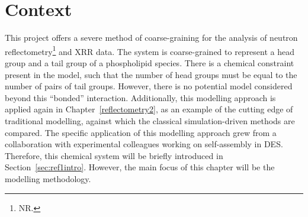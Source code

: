 \section*{Context}
This project offers a severe method of coarse-graining for the analysis of neutron reflectometry\footnote{NR.} and XRR data.
The system is coarse-grained to represent a head group and a tail group of a phospholipid species.
There is a chemical constraint present in the model, such that the number of head groups must be equal to the number of pairs of tail groups.
However, there is no potential model considered beyond this ``bonded'' interaction.
Additionally, this modelling approach is applied again in Chapter~\ref{reflectometry2}, as an example of the cutting edge of traditional modelling, against which the classical simulation-driven methods are compared.
The specific application of this modelling approach grew from a collaboration with experimental colleagues working on self-assembly in DES.
Therefore, this chemical system will be briefly introduced in Section~\ref{sec:ref1intro}.
However, the main focus of this chapter will be the modelling methodology.
